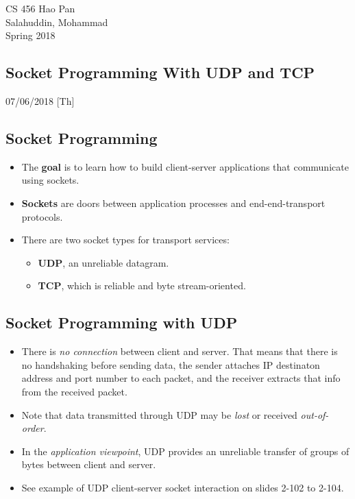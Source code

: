 \documentclass{article}
\begin{document}
\noindent
{CS 456 \hfill Hao Pan}\\
{Salahuddin, Mohammad}\\
{Spring 2018}


\begin{center}
\section{Socket Programming With UDP and TCP}
\noindent
{\hfill 07/06/2018 [Th]}
\end{center}

\subsection{Socket Programming}

\begin{itemize}
\item The {\bf goal} is to learn how to build client-server applications that communicate using sockets.
\item {\bf Sockets} are doors between application processes and end-end-transport protocols.
\item There are two socket types for transport services:
\begin{itemize}
\item {\bf UDP}, an unreliable datagram.
\item {\bf TCP}, which is reliable and byte stream-oriented.
\end{itemize}
\end{itemize}

\subsection{Socket Programming with UDP}

\begin{itemize}
\item There is \emph{no connection} between client and server. That means that there is no handshaking before sending data, the sender attaches IP destinaton address and port number to each packet, and the receiver extracts that info from the received packet.
\item Note that data transmitted through UDP may be \emph{lost} or received \emph{out-of-order}.
\item In the \emph{application viewpoint}, UDP provides an unreliable transfer of groups of bytes between client and server.
\item See example of UDP client-server socket interaction on slides 2-102 to 2-104.
\end{itemize}
\end{document}
